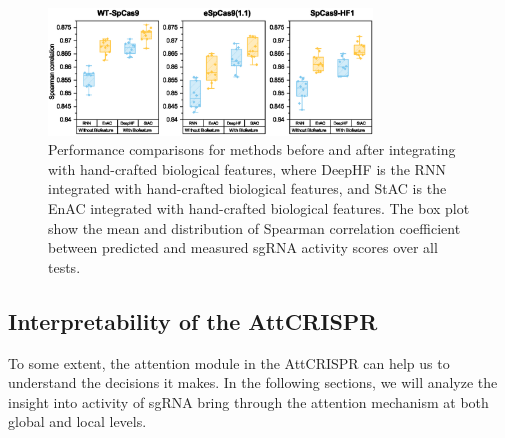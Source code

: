 \documentclass{bioinfo}
\begin{document}
\begin{figure}[!tpb]%
    \centerline{\includegraphics[width=86mm]{baselinewithbiofeat.eps}}
    \caption{
Performance comparisons for methods before and after integrating with hand-crafted biological features, 
where DeepHF is the RNN integrated with hand-crafted biological features, 
and StAC is the EnAC integrated with hand-crafted biological features. 
The box plot show the mean and distribution of Spearman correlation coefficient between predicted and measured sgRNA activity scores over all tests.
}\label{fig:07}
\end{figure}

\subsection{Interpretability of the AttCRISPR}\label{section:interpretability}

To some extent, the attention module in the AttCRISPR can help us to understand the decisions it makes. 
In the following sections, we will analyze the insight into activity of sgRNA bring through the attention mechanism at both global and local levels. 
\end{document}
